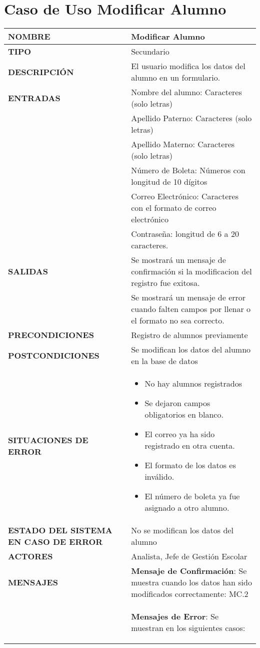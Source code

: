 \newpage
\section{Caso de Uso Modificar Alumno}
\begin{longtable}{ | p{6cm} | p{10cm} |}
\hline
\textbf{NOMBRE} & Modificar Alumno\\
\hline
\textbf{TIPO} & Secundario\\
\hline
\textbf{DESCRIPCIÓN} & El usuario modifica los datos del alumno en un formulario.\\
\hline
\textbf{ENTRADAS} & Nombre del alumno: Caracteres (solo letras)\\& Apellido Paterno: Caracteres (solo letras)\\& Apellido Materno: Caracteres (solo letras)\\&Número de Boleta: Números con longitud de 10 dígitos\\& Correo Electrónico: Caracteres con el formato de correo electrónico\\& Contraseña: longitud de 6 a 20 caracteres.\\
\hline
\textbf{SALIDAS} & Se mostrará un mensaje de confirmación si la modificacion del registro fue exitosa.\\& Se mostrará un mensaje de error cuando falten campos por llenar o el formato no sea correcto.\\
\hline
\textbf{PRECONDICIONES} & Registro de alumnos previamente \\
\hline
\textbf{POSTCONDICIONES} & Se modifican los datos del alumno en la base de datos  \\
\hline
\textbf{SITUACIONES DE ERROR} & \begin{itemize}
   \item  No hay alumnos registrados
    \item Se dejaron campos obligatorios en blanco.
    \item El correo ya ha sido registrado en otra cuenta.
    \item El formato de los datos es inválido.
    \item El número de boleta ya fue asignado a otro alumno.
\end{itemize}\\
\hline
\textbf{ESTADO DEL SISTEMA EN CASO DE ERROR} & No se modifican los datos del alumno\\
\hline
\textbf{ACTORES} & Analista, Jefe de Gestión Escolar\\
\hline
\textbf{MENSAJES} & \textbf{Mensaje de Confirmación}: Se muestra cuando los datos han sido modificados correctamente: MC.2\\&\textbf{Mensajes de Error}: Se muestran en los siguientes casos:\begin{itemize}

\end{itemize}
\end{longtable}
